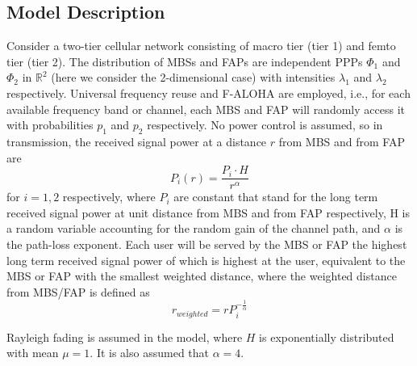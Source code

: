 \documentclass[a4paper,twocolumn]{IEEEtran}
\begin{document}
\subsection{Model Description}
Consider a two-tier cellular network consisting of macro tier (tier 1) and femto tier (tier 2). The distribution of MBSs and FAPs are independent PPPs $\Phi_1$ and $\Phi_2$ in $\mathbb{R}^2$ (here we consider the 2-dimensional case) with intensities $\lambda_1$ and $\lambda_2$ respectively. Universal frequency reuse and F-ALOHA are employed, i.e., for each available frequency band or channel, each MBS and FAP will randomly access it with probabilities $p_1$ and $p_2$ respectively. No power control is assumed, so in transmission, the received signal power at a distance $r$ from MBS and from FAP are
\begin{equation}
P_i(r)=\frac{P_i \cdot H}{r^\alpha} 
\end{equation}
for $i=1, 2$ respectively, where $P_i$ are constant that stand for the long term received signal power at unit distance from MBS and from FAP respectively, H is a random variable accounting for the random gain of the channel path, and $\alpha$ is the path-loss exponent. Each user will be served by the MBS or FAP the highest long term received signal power of which is highest at the user, equivalent to the MBS or FAP with the smallest weighted distance, where the weighted distance from MBS/FAP is defined as
\begin{equation}
r_{weighted}=r P_i^{-\frac{1}{\alpha}}
\end{equation}

Rayleigh fading is assumed in the model, where $H$ is exponentially distributed with mean $\mu = 1$. It is also assumed that $\alpha = 4$.
\end{document}
